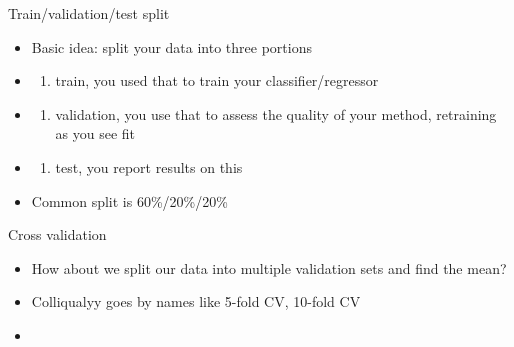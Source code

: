 \documentclass[obeyspaces,aspectratio=43]{beamer}
\renewcommand{\href}[2]{#2\footnote{\url{#1}}}
\providecommand{\tightlist}{%
  \setlength{\itemsep}{0pt}\setlength{\parskip}{0pt}}
\begin{document}
\begin{frame}{Train/validation/test split}

\begin{itemize}
\item
  Basic idea: split your data into three portions
\item
  \begin{enumerate}
  \def\labelenumi{(\alph{enumi})}
  \tightlist
  \item
    train, you used that to train your classifier/regressor
  \end{enumerate}
\item
  \begin{enumerate}
  \def\labelenumi{(\alph{enumi})}
  \setcounter{enumi}{1}
  \tightlist
  \item
    validation, you use that to assess the quality of your method,
    retraining as you see fit
  \end{enumerate}
\item
  \begin{enumerate}
  \def\labelenumi{(\alph{enumi})}
  \setcounter{enumi}{2}
  \tightlist
  \item
    test, you report results on this
  \end{enumerate}
\item
  Common split is 60\%/20\%/20\%
\end{itemize}

\end{frame}

\begin{frame}{Cross validation}

\begin{itemize}
\item
  How about we split our data into multiple validation sets and find the
  mean?
\item
  Colliqualyy goes by names like 5-fold CV, 10-fold CV
\item
\end{itemize}

\end{frame}

\begin{frame}{Pictorial depiction of 5-fold CV}

\href{https://scikit-learn.org/stable/_images/grid_search_cross_validation.png}{Copied
from SKlearns website}

\texttt{[image: ./graphics/\{grid\_search\_cross\_validation]}.png}

\end{frame}
\end{document}
